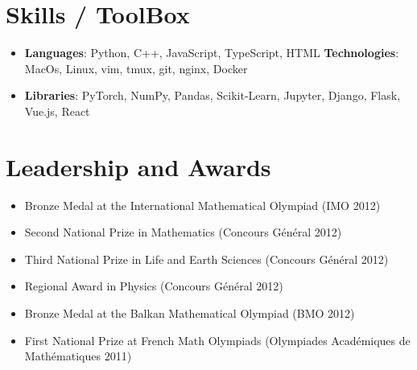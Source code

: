 \documentclass[letterpaper,10pt]{article}
\newcommand{\resumeSubHeadingListStart}{\begin{itemize}[leftmargin=*]}
\newcommand{\resumeSubHeadingListEnd}{\end{itemize}}
\newcommand{\shorterSection}[1]{\vspace{-10pt}\section{#1}}
\begin{document}
\shorterSection{Skills / ToolBox}
  \resumeSubHeadingListStart
  \small
    \item{
     \textbf{Languages}{: Python, C++, JavaScript, TypeScript, HTML}
     \hfill
     \textbf{Technologies}{: MacOs, Linux, vim, tmux, git, nginx, Docker}
    }
    \vspace{-5pt}
    \item{
     \textbf{Libraries}{: PyTorch, NumPy, Pandas, Scikit-Learn, Jupyter, Django, Flask, Vue.js, React}
    }
\resumeSubHeadingListEnd
\shorterSection{Leadership and Awards}
  \resumeSubHeadingListStart
\item\small {Bronze Medal at the International Mathematical Olympiad (IMO 2012)}
    \vspace{-5pt}
\item\small {Second National Prize in Mathematics (Concours Général 2012)}
    \vspace{-5pt}
\item\small {Third National Prize in Life and Earth Sciences (Concours Général 2012)}
    \vspace{-5pt}
\item\small {Regional Award in Physics (Concours Général 2012)}
    \vspace{-5pt}
\item\small {Bronze Medal at the Balkan Mathematical Olympiad (BMO 2012)}
    \vspace{-5pt}
\item\small {First National Prize at French Math Olympiads (Olympiades Académiques de Mathématiques 2011)}
  \resumeSubHeadingListEnd
\end{document}
